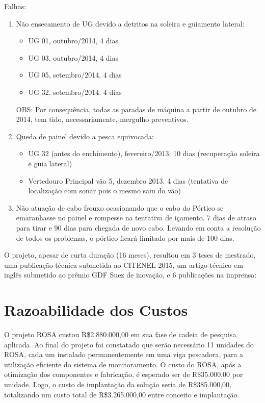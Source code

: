 Falhas:
\begin{enumerate}
\item Não ensecamento de UG devido a detritos na soleira e guiamento lateral:
\begin{itemize}
\item UG 01, outubro/2014, 4 dias
\item UG 03, outubro/2014, 4 dias
\item UG 05, setembro/2014, 4 dias
\item UG 32, setembro/2014. 4 dias	
\end{itemize}
OBS: Por consequência, todas as paradas de máquina a partir de
outubro de 2014, tem tido, necessariamente, mergulho
preventivos. 
\item Queda de painel devido a pesca equivocada:
\begin{itemize}
\item UG 32 (antes do enchimento), fevereiro/2013; 10 dias (recuperação
soleira e guia lateral)
\item Vertedouro Principal vão 5, dezembro 2013. 4 dias (tentativa de
localização com sonar pois o mesmo saiu do vão)
\end{itemize}
\item Não atuação de cabo frouxo ocasionando que o cabo do Pórtico se
emaranhasse no painel e rompesse na tentativa de içamento. 7 dias de atraso 
para tirar e 90 dias para chegada de novo cabo. Levando em conta a resolução 
de todos os problemas, o pórtico ficará limitado por mais de 100 dias.
\end{enumerate}

O projeto, apesar de curta duração (16 meses), resultou em 3 teses de 
mestrado, uma publicação técnica submetida ao CITENEL 2015, um artigo técnico 
em inglês submetido ao prêmio GDF Suez de inovação, e 6 publicações na imprensa: 

 
     
\section{Razoabilidade dos Custos}
O projeto ROSA custou R\$2.880.000,00 em sua fase de cadeia de pesquisa
aplicada. Ao final do projeto foi constatado que serão necessário 11 unidades 
do ROSA, cada um instalado permanentemente em uma viga pescadora, para a
utilização eficiente do sistema de monitoramento. O custo do ROSA, após a
otimização dos componentes e fabricação, é esperado ser de R\$35.000,00 por
unidade. Logo, o custo de implantação da solução seria de R\$385.000,00,
totalizando um custo total de R\$3.265.000,00 entre conceito e implantação.

